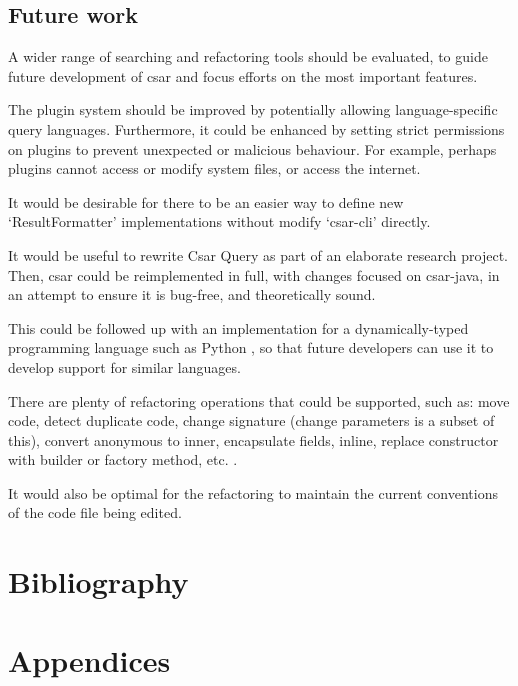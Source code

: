 \documentclass[12pt, letterpaper]{article}
\begin{document}
\subsection{Future work}
A wider range of searching and refactoring tools should be evaluated, to guide future development of csar and focus efforts on the most important features.

The plugin system should be improved by potentially allowing language-specific query languages.
Furthermore, it could be enhanced by setting strict permissions on plugins to prevent unexpected or malicious behaviour.
For example, perhaps plugins cannot access or modify system files, or access the internet.

It would be desirable for there to be an easier way to define new `ResultFormatter' implementations without modify `csar-cli' directly.

It would be useful to rewrite Csar Query as part of an elaborate research project.
Then, csar could be reimplemented in full, with changes focused on csar-java, in an attempt to ensure it is bug-free, and theoretically sound.

This could be followed up with an implementation for a dynamically-typed programming language such as Python \autocite{learningpython5thed}, so that future developers can use it to develop support for similar languages.

There are plenty of refactoring operations that could be supported, such as: move code, detect duplicate code, change signature (change parameters is a subset of this), convert anonymous to inner, encapsulate fields, inline, replace constructor with builder or factory method, etc. \autocite{intellijidearefactoring}.

It would also be optimal for the refactoring to maintain the current conventions of the code file being edited.

\section{Bibliography}
\printbibliography[heading=none]

\section{Appendices}

\end{document}

